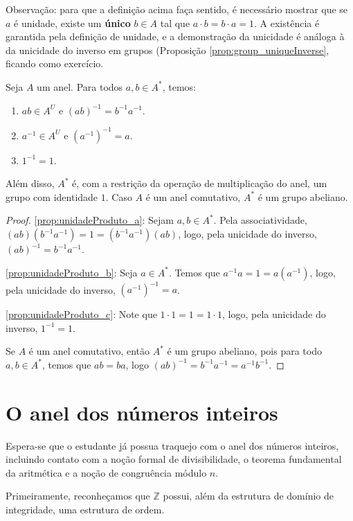 Observação: para que a definição acima faça sentido, é necessário mostrar que se $a$ é unidade, existe um \textbf{único} $b \in A$ tal que $a \cdot b = b \cdot a = 1$.
A existência é garantida pela definição de unidade, e a demonstração da unicidade é análoga à da unicidade do inverso em grupos (Proposição \ref{prop:group_uniqueInverse}, ficando como exercício.

\begin{prop}
Seja $A$ um anel. Para todos $a, b \in A^*$, temos:
\begin{enumerate}[label=\alph*)]
    \item $ab\in A^U$ e $(ab)^{-1}=b^{-1}a^{-1}$.\label{prop:unidadeProduto_a}
    \item $a^{-1}\in A^U$ e $(a^{-1})^{-1}=a$.\label{prop:unidadeProduto_b}
    \item $1^{-1}=1$.\label{prop:unidadeProduto_c}
\end{enumerate}
Além disso, $A^*$ é, com a restrição da operação de multiplicação do anel, um grupo com identidade $1$. Caso $A$ é um anel comutativo, $A^*$ é um grupo abeliano.
\end{prop}
\begin{proof}
    \ref{prop:unidadeProduto_a}: Sejam $a, b \in A^*$. Pela associatividade, $(ab)(b^{-1}a^{-1})=1=(b^{-1}a^{-1})(ab)$, logo, pela unicidade do inverso, $(ab)^{-1}=b^{-1}a^{-1}$.

    \ref{prop:unidadeProduto_b}: Seja $a \in A^*$. Temos que $a^{-1}a=1=a(a^{-1})$, logo, pela unicidade do inverso, $(a^{-1})^{-1}=a$.

    \ref{prop:unidadeProduto_c}: Note que $1\cdot 1=1=1\cdot 1$, logo, pela unicidade do inverso, $1^{-1}=1$.

    Se $A$ é um anel comutativo, então $A^*$ é um grupo abeliano, pois para todo $a, b \in A^*$, temos que $ab=ba$, logo $(ab)^{-1}=b^{-1}a^{-1}=a^{-1}b^{-1}$.
\end{proof}

\section{O anel dos números inteiros}
Espera-se que o estudante já possua traquejo com o anel dos números inteiros, incluindo contato com a noção formal de divisibilidade, o teorema fundamental da aritmética e a noção de congruência módulo $n$.

Primeiramente, reconheçamos que $\mathbb Z$ possui, além da estrutura de domínio de integridade, uma estrutura de ordem.

